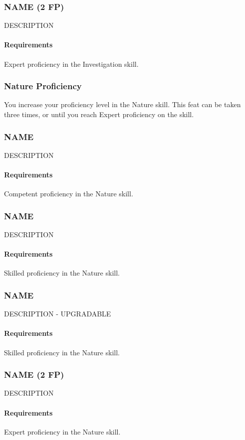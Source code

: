 \subsubsection{NAME (2 FP)} \label{feat::name}
    DESCRIPTION
    \paragraph{Requirements} Expert proficiency in the Investigation skill.
\subsubsection{Nature Proficiency} \label{feat::natureprof}
    You increase your proficiency level in the Nature skill.
    This feat can be taken three times, or until you reach Expert proficiency on the skill.
\subsubsection{NAME} \label{feat::name}
    DESCRIPTION
    \paragraph{Requirements} Competent proficiency in the Nature skill.
\subsubsection{NAME} \label{feat::name}
    DESCRIPTION
    \paragraph{Requirements} Skilled proficiency in the Nature skill.
\subsubsection{NAME} \label{feat::name}
    DESCRIPTION - UPGRADABLE
    \paragraph{Requirements} Skilled proficiency in the Nature skill.
\subsubsection{NAME (2 FP)} \label{feat::name}
    DESCRIPTION
    \paragraph{Requirements} Expert proficiency in the Nature skill.
